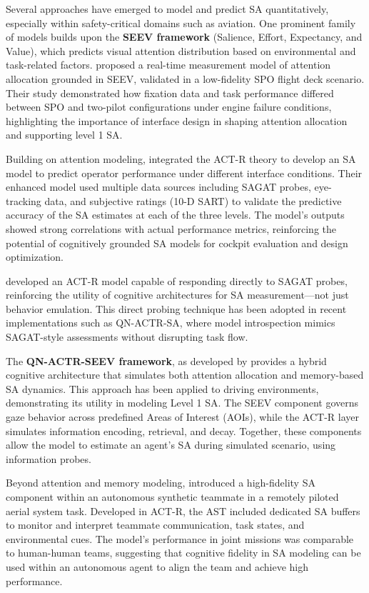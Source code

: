 \documentclass[12pt,a4paper]{article} %
\begin{document}
	Several approaches have emerged to model and predict SA quantitatively, especially within safety-critical domains such as aviation. One prominent family of models builds upon the \textbf{SEEV framework} (Salience, Effort, Expectancy, and Value), which predicts visual attention distribution based on environmental and task-related factors. \textcite{wang_real-time_2024} proposed a real-time measurement model of attention allocation grounded in SEEV, validated in a low-fidelity SPO flight deck scenario. Their study demonstrated how fixation data and task performance differed between SPO and two-pilot configurations under engine failure conditions, highlighting the importance of interface design in shaping attention allocation and supporting level 1 SA.

	Building on attention modeling, \textcite{chen_developing_2021} integrated the ACT-R theory to develop an SA model to predict operator performance under different interface conditions. Their enhanced model used multiple data sources including SAGAT probes, eye-tracking data, and subjective ratings (10-D SART) to validate the predictive accuracy of the SA estimates at each of the three levels. The model's outputs showed strong correlations with actual performance metrics, reinforcing the potential of cognitively grounded SA models for cockpit evaluation and design optimization.

	\textcite{juarez-espinosa_situation_nodate} developed an ACT-R model capable of responding directly to SAGAT probes, reinforcing the utility of cognitive architectures for SA measurement—not just behavior emulation. This direct probing technique has been adopted in recent implementations such as QN-ACTR-SA, where model introspection mimics SAGAT-style assessments without disrupting task flow.

	The \textbf{QN-ACTR-SEEV framework}, as developed by \textcite{rehman_phd_thesis} provides a hybrid cognitive architecture that simulates both attention allocation and memory-based SA dynamics. This approach has been applied to driving environments, demonstrating its utility in modeling Level 1 SA. The SEEV component governs gaze behavior across predefined Areas of Interest (AOIs), while the ACT-R layer simulates information encoding, retrieval, and decay. Together, these components allow the model to estimate an agent's SA during simulated scenario, using information probes.

	Beyond attention and memory modeling, \textcite{freiman_assessing_2019} introduced a high-fidelity SA component within an autonomous synthetic teammate in a remotely piloted aerial system task. Developed in ACT-R, the AST included dedicated SA buffers to monitor and interpret teammate communication, task states, and environmental cues. The model's performance in joint missions was comparable to human-human teams, suggesting that cognitive fidelity in SA modeling can be used within an autonomous agent to align the team and achieve high performance.
\end{document}
